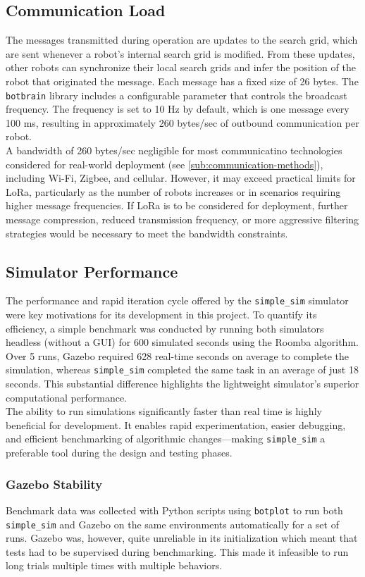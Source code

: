 \subsection{Communication Load}
The messages transmitted during operation are updates to the search grid, which are sent whenever a robot’s internal search grid is modified. From these updates, other robots can synchronize their local search grids and infer the position of the robot that originated the message. Each message has a fixed size of 26 bytes. The \texttt{botbrain} library includes a configurable parameter that controls the broadcast frequency. The frequency is set to 10 Hz by default, which is one message every 100 ms, resulting in approximately 260 bytes/sec of outbound communication per robot. \\

A bandwidth of 260 bytes/sec negligible for most communicatino technologies considered for real-world deployment (see \cref{sub:communication-methods}), including Wi-Fi, Zigbee, and cellular. However, it may exceed practical limits for LoRa, particularly as the number of robots increases or in scenarios requiring higher message frequencies. If LoRa is to be considered for deployment, further message compression, reduced transmission frequency, or more aggressive filtering strategies would be necessary to meet the bandwidth constraints.

\subsection{Simulator Performance}
\label{sec:simulator-performance}
The performance and rapid iteration cycle offered by the \texttt{simple\_sim} simulator were key motivations for its development in this project. To quantify its efficiency, a simple benchmark was conducted by running both simulators headless (without a GUI) for 600 simulated seconds using the Roomba algorithm. Over 5 runs, Gazebo required 628 real-time seconds on average to complete the simulation, whereas \texttt{simple\_sim} completed the same task in an average of just 18 seconds. This substantial difference highlights the lightweight simulator’s superior computational performance. \\

The ability to run simulations significantly faster than real time is highly beneficial for development. It enables rapid experimentation, easier debugging, and efficient benchmarking of algorithmic changes—making \texttt{simple\_sim} a preferable tool during the design and testing phases.

\subsubsection{Gazebo Stability}
Benchmark data was collected with Python scripts using \texttt{botplot} to run both \texttt{simple\_sim} and Gazebo on the same environments automatically for a set of runs. Gazebo was, however, quite unreliable in its initialization which meant that tests had to be supervised during benchmarking. This made it infeasible to run long trials multiple times with multiple behaviors.


